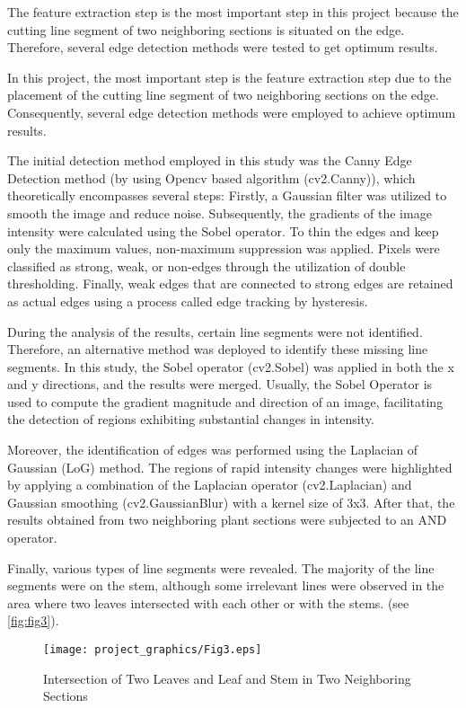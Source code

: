 \documentclass[]{iat}
\begin{document}
The feature extraction step is the most important step in this project because the cutting line segment of two neighboring sections is situated on the edge. Therefore, several edge detection methods were tested to get optimum results.
\par
In this project, the most important step is the feature extraction step due to the placement of the cutting line segment of two neighboring sections on the edge. Consequently, several edge detection methods were employed to achieve optimum results.
\par
The initial detection method employed in this study was the Canny Edge Detection method (by using Opencv based algorithm (cv2.Canny)), which theoretically encompasses several steps: Firstly, a Gaussian filter was utilized to smooth the image and reduce noise. Subsequently, the gradients of the image intensity were calculated using the Sobel operator. To thin the edges and keep only the maximum values, non-maximum suppression was applied. Pixels were classified as strong, weak, or non-edges through the utilization of double thresholding. Finally, weak edges that are connected to strong edges are retained as actual edges using a process called edge tracking by hysteresis. 
\par
During the analysis of the results, certain line segments were not identified. Therefore, an alternative method was deployed to identify these missing line segments. In this study, the Sobel operator (cv2.Sobel) was applied in both the x and y directions, and the results were merged. Usually, the Sobel Operator is used to compute the gradient magnitude and direction of an image, facilitating the detection of regions exhibiting substantial changes in intensity. 
\par
Moreover, the identification of edges was performed using the Laplacian of Gaussian (LoG) method. The regions of rapid intensity changes were highlighted by applying a combination of the Laplacian operator (cv2.Laplacian) and Gaussian smoothing (cv2.GaussianBlur) with a kernel size of 3x3. After that, the results obtained from two neighboring plant sections were subjected to an AND operator. 
\par
Finally, various types of line segments were revealed. The majority of the line segments were on the stem, although some irrelevant lines were observed in the area where two leaves intersected with each other or with the stems. (see \autoref{fig:fig3}).
\par
\FloatBarrier
\newpage
\begin{figure}[h]
    
	\texttt{[image: project\_graphics/Fig3.eps]}
	\caption{Intersection of Two Leaves and Leaf and Stem in Two Neighboring Sections}
	\label{fig:fig3}
\end{figure}
\end{document}
